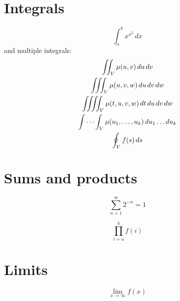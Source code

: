 \documentclass{article}
\begin{document}
\section{Integrals}

\[
    \int_{a}^{b} x^{x^2} \,dx
\]
and multiple integrals:
\begin{gather*}
    \iint_V \mu(u,v) \,du\,dv
\\
    \iiint_V \mu(u,v,w) \,du\,dv\,dw
\\
    \iiiint_V \mu(t,u,v,w) \,dt\,du\,dv\,dw
\\
    \idotsint_V \mu(u_1,\dots,u_k) \,du_1 \dots du_k
\\
    \oint_V f(s) \,ds
\end{gather*}

\section{Sums and products}

\[
    \sum_{n=1}^{\infty} 2^{-n} = 1
\]

\[
    \prod_{i=a}^{b} f(i)
\]

\section{Limits}

\[
    \lim_{x\to\infty} f(x)
\]
\end{document}
